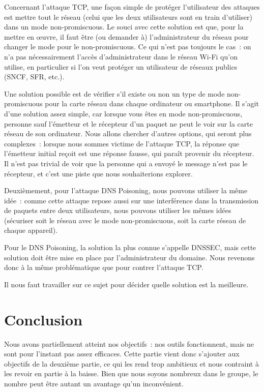 \documentclass[a4paper, 12pt,twoside]{article}
\begin{document}
            Concernant l'attaque TCP, une façon simple de protéger l'utilisateur des attaques est mettre tout le réseau (celui que les deux utilisateurs sont en train d'utiliser) dans un mode non-promiscuous. Le souci avec cette solution est que, pour la mettre en \oe{}uvre, il faut être (ou demander à) l'administrateur du réseau pour changer le mode pour le non-promiscuous. Ce qui n'est pas toujours le cas~: on n'a pas nécessairement l'accès d'administrateur dans le réseau Wi-Fi qu'on utilise, en particulier si l'on veut protéger un utilisateur de réseaux publics (SNCF, SFR, etc.).

            Une solution possible est de vérifier s'il existe ou non un type de mode non-promiscuous pour la carte réseau dans chaque ordinateur ou smartphone. Il s'agit d'une solution assez simple, car lorsque vous êtes en mode non-promiscuous, personne sauf l'émetteur et le récepteur d'un paquet ne peut le voir sur la carte réseau de son ordinateur. Nous allons chercher d'autres options, qui seront plus complexes~:  lorsque nous sommes victime de l'attaque TCP, la réponse que l'émetteur initial reçoit est une réponse fausse, qui paraît provenir du récepteur. Il n'est pas trivial de voir que la personne qui a envoyé le message n'est pas le récepteur, et c'est une piste que nous souhaiterions explorer.

            Deuxièmement, pour l'attaque DNS Poisoning, nous pouvons utiliser la même idée~: comme cette attaque repose aussi sur une interférence dans la transmission de paquets entre deux utilisateurs, nous pouvons utiliser les mêmes idées (sécuriser soit le réseau avec le mode non-promiscuous, soit la carte réseau de chaque appareil).

            Pour le DNS Poisoning, la solution la plus connue s'appelle DNSSEC, mais cette solution doit être mise en place par l'administrateur du domaine. Nous revenons donc à la même problématique que pour contrer l'attaque TCP.

            Il nous faut travailler sur ce sujet pour décider quelle solution est la meilleure.

    \clearpage
    \section{Conclusion}

        Nous avons partiellement atteint nos objectifs~: nos outils fonctionnent, mais ne sont pour l'instant pas assez efficaces. Cette partie vient donc s'ajouter aux objectifs de la deuxième partie, ce qui les rend trop ambitieux et nous contraint à les revoir en partie à la baisse. Bien que nous soyons nombreux dans le groupe, le nombre peut être autant un avantage qu'un inconvénient.
\end{document}
